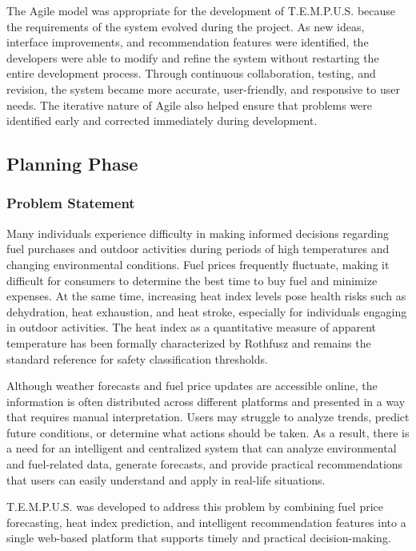 \documentclass[12pt]{article}
\begin{document}
The Agile model was appropriate for the development of T.E.M.P.U.S. because the requirements of the system evolved during the project. As new ideas, interface improvements, and recommendation features were identified, the developers were able to modify and refine the system without restarting the entire development process. Through continuous collaboration, testing, and revision, the system became more accurate, user-friendly, and responsive to user needs. The iterative nature of Agile also helped ensure that problems were identified early and corrected immediately during development.

\subsection{Planning Phase}

\subsubsection{Problem Statement}

Many individuals experience difficulty in making informed decisions regarding fuel purchases and outdoor activities during periods of high temperatures and changing environmental conditions. Fuel prices frequently fluctuate, making it difficult for consumers to determine the best time to buy fuel and minimize expenses. At the same time, increasing heat index levels pose health risks such as dehydration, heat exhaustion, and heat stroke, especially for individuals engaging in outdoor activities. The heat index as a quantitative measure of apparent temperature has been formally characterized by Rothfusz and remains the standard reference for safety classification thresholds.

Although weather forecasts and fuel price updates are accessible online, the information is often distributed across different platforms and presented in a way that requires manual interpretation. Users may struggle to analyze trends, predict future conditions, or determine what actions should be taken. As a result, there is a need for an intelligent and centralized system that can analyze environmental and fuel-related data, generate forecasts, and provide practical recommendations that users can easily understand and apply in real-life situations.

T.E.M.P.U.S. was developed to address this problem by combining fuel price forecasting, heat index prediction, and intelligent recommendation features into a single web-based platform that supports timely and practical decision-making.
\end{document}
